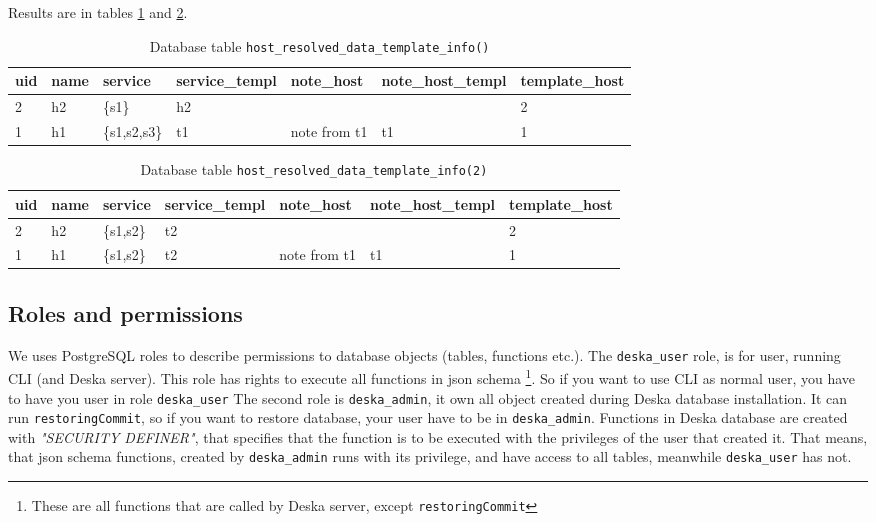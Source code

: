 \documentclass[deska]{subfiles}
\begin{document}
Results are in tables \ref{tab:multi-reshost} and \ref{tab:multi-reshostv2}.

\begin{longtable}{ l | l | l | l | l | l | l }
    \caption{Database table {\tt host\_resolved\_data\_template\_info()}}\\
    uid &  name &  service &  service\_templ &  note\_host &  note\_host\_templ &  template\_host\\
    \hline
    \endhead
\label{tab:multi-reshost}
    2 & h2 & \{s1\} & h2 &  &  & 2\\
    1 & h1 & \{s1,s2,s3\} & t1 & note from t1 & t1 & 1\\
    \hline
\end{longtable}

\begin{longtable}{ l | l | l | l | l | l | l }
    \caption{Database table {\tt host\_resolved\_data\_template\_info(2)}}\\
    uid &  name &  service &  service\_templ &  note\_host &  note\_host\_templ &  template\_host\\
    \hline
    \endhead
\label{tab:multi-reshostv2}
    2 & h2 & \{s1,s2\} & t2 &  &  & 2\\
    1 & h1 & \{s1,s2\} & t2 & note from t1 & t1 & 1\\
    \hline
\end{longtable}

\subsection{Roles and permissions}
We uses PostgreSQL roles to describe permissions to database objects (tables, functions etc.).
The {\tt deska\_user} role, is for user, running CLI (and Deska server). This role
has rights to execute all functions in json schema \footnote{These are all functions
that are called by Deska server, except {\tt restoringCommit}}.
So if you want to use CLI as normal user, you have to have you user in role {\tt deska\_user}
The second role is {\tt deska\_admin}, it own all object created during Deska database installation.
It can run {\tt restoringCommit}, so if you want to restore database, your user have to be in {\tt deska\_admin}.
Functions in Deska database are created with {\em "SECURITY DEFINER"}, that
specifies that the function is to be executed with the privileges of the user that created it.
That means, that json schema functions, created by {\tt deska\_admin} runs with its privilege,
and have access to all tables, meanwhile {\tt deska\_user} has not.
\end{document}
